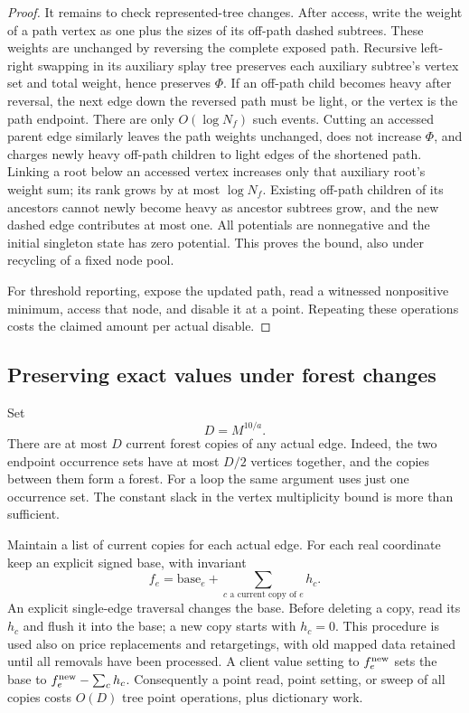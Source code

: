 \begin{proof}
It remains to check represented-tree changes.  After access, write the
weight of a path vertex as one plus the sizes of its off-path dashed
subtrees.  These weights are unchanged by reversing the complete
exposed path.  Recursive left-right swapping in its auxiliary splay tree
preserves each auxiliary subtree's vertex set and total weight, hence
preserves $\Phi$.  If an off-path child becomes heavy after reversal,
the next edge down the reversed path must be light, or the vertex is
the path endpoint.  There are only $O(\log N_f)$ such events.  Cutting
an accessed parent edge similarly leaves the path weights unchanged,
does not increase $\Phi$, and charges newly heavy off-path children to
light edges of the shortened path.  Linking a root below an accessed
vertex increases only that auxiliary root's weight sum; its rank grows
by at most $\log N_f$.  Existing off-path children of its ancestors
cannot newly become heavy as ancestor subtrees grow, and the new dashed
edge contributes at most one.  All potentials are nonnegative and the
initial singleton state has zero potential.  This proves the bound,
also under recycling of a fixed node pool.

For threshold reporting, expose the updated path, read a witnessed
nonpositive minimum, access that node, and disable it at a point.
Repeating these operations costs the claimed amount per actual disable.
\end{proof}

\subsection{Preserving exact values under forest changes}
\label{engine:exact-values}

Set
\begin{equation}\label{engine:copy-bound}
                              D=M^{10/a}.
\end{equation}
There are at most $D$ current forest copies of any actual edge.  Indeed,
the two endpoint occurrence sets have at most $D/2$ vertices together,
and the copies between them form a forest.  For a loop the same argument
uses just one occurrence set.  The constant slack in the vertex
multiplicity bound is more than sufficient.

Maintain a list of current copies for each actual edge.  For each real
coordinate keep an explicit signed base, with invariant
\begin{equation}\label{engine:value-invariant}
                   f_e=\mathrm{base}_e+
                           \sum_{c\text{ a current copy of }e} h_c.
\end{equation}
An explicit single-edge traversal changes the base.  Before deleting a
copy, read its $h_c$ and flush it into the base; a new copy starts with
$h_c=0$.  This procedure is used also on price replacements and
retargetings, with old mapped data retained until all removals have been
processed.  A client value setting to $f_e^{\rm new}$ sets the base to
$f_e^{\rm new}-\sum_c h_c$.  Consequently a point read, point setting,
or sweep of all copies costs $O(D)$ tree point operations, plus
dictionary work.

